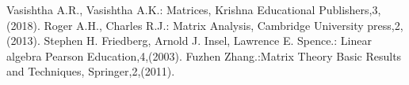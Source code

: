 \documentclass[11pt]{extarticle}
\begin{document}
\begin{multicols}{2}
\begin{thebibliography}{9}
	Vasishtha A.R., Vasishtha A.K.: Matrices, Krishna Educational Publishers,3,(2018).  
	Roger A.H., Charles R.J.: Matrix Analysis, Cambridge University press,2,(2013). 
	Stephen H. Friedberg, Arnold J. Insel, Lawrence E. Spence.: Linear algebra Pearson Education,4,(2003).
	Fuzhen Zhang.:Matrix Theory Basic Results and Techniques, Springer,2,(2011).
\end{thebibliography}
\end{multicols}
\end{document}
